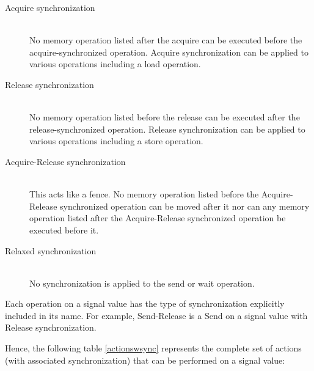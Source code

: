 \documentclass{book}
\begin{document}
\begin{description}
        \item[Acquire synchronization] \hfill \\
                No memory operation listed after the acquire can be
                executed before the acquire-synchronized operation. Acquire
                synchronization can be applied to various operations
                including a load operation.
        \item[Release synchronization] \hfill \\
                No memory operation listed before the release can be
                executed after the release-synchronized operation. Release
                synchronization can be applied to various operations
                including a store operation.
        \item[Acquire-Release synchronization] \hfill \\
                This acts like a fence. No memory operation listed
                before the Acquire-Release synchronized operation
                can be moved after it nor can any memory operation
                listed after the Acquire-Release synchronized
                operation be executed before it.
        \item[Relaxed synchronization] \hfill \\
                No synchronization is applied to the send or wait
                operation.
\end{description}

Each operation on a signal value has the type of synchronization
explicitly included in its name. For example, Send-Release is a Send
on a signal value with Release synchronization.

Hence, the following table \ref{actionswsync} represents the complete set of actions (with
associated synchronization) that can be performed on a signal value:
\end{document}
